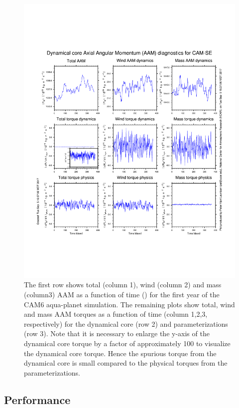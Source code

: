 \documentclass{agujournal}
\begin{document}
{



\begin{figure}[h]
\centering
\includegraphics[width=30pc]{figs/aam.pdf}
\caption{The first row shows total (column 1), wind (column 2) and mass (column3) AAM as a function of time ({\color{red}{ADAM: is this daily instantaneous}}) for the first year of the CAM6 aqua-planet simulation. The remaining plots show total, wind and mass AAM torques as a function of time (column 1,2,3, respectively) for the dynamical core (row 2) and parameterizations (row 3). Note that it is necessary to enlarge the y-axis of the dynamical core torque by a factor of approximately 100 to visualize the dynamical core torque. Hence the spurious torque from the dynamical core is small compared to the physical torques from the parameterizations.}
\label{fig:aam}
\end{figure}
\subsection{Performance}\label{sec:performance}

}
\end{document}
